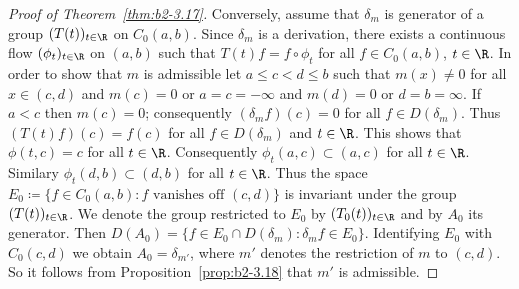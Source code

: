 \begin{proof}[Proof of Theorem~\ref{thm:b2-3.17}]
Conversely, assume that $\delta_{m}$ is generator of a group $(T(t))_{t \in \R}$ on $C_{0}(a,b)$.
Since $\delta_{m}$ is a derivation, there exists a continuous flow $(\phi_{t})_{t \in \R}$ on $(a,b)$ such that $T(t)f = f \circ \phi_{t}$ for all $f \in C_{0}(a,b)$, $t \in \R$.
In order to show that $m$ is admissible let $a \leq c < d \leq b$ such that $m(x) \neq 0$ for all $x \in (c,d)$ and $m(c) = 0$ or $a = c = -\infty$ and $m(d) = 0$ or $d = b = \infty$.
If\/ $a < c$ then $m(c) = 0$; consequently $(\delta_{m}f)(c) = 0$ for all $f \in D(\delta_{m})$.
Thus $(T(t)f)(c) = f(c)$ for all $f \in D(\delta_{m})$ and $t \in \R$.
This shows that $\phi(t,c) = c$ for all $t \in \R$.
Consequently $\phi_{t}(a,c) \subset (a,c)$ for all $t \in \R$.
Similary $\phi_{t}(d,b) \subset (d,b)$ for all $t \in \R$.
Thus the space $E_{0} \coloneqq \{f \in C_{0}(a,b) \colon f \text{ vanishes off } (c,d)\}$ is invariant under the group $(T(t))_{t \in \R}$.
We denote the group restricted to $E_{0}$ by $(T_{0}(t))_{t \in \R}$ and by $A_{0}$ its generator.
Then $D(A_{0}) = \{f \in E_{0} \cap D(\delta_{m}) \colon \delta_{m}f \in E_{0}\}$.
Identifying $E_{0}$ with $C_{0}(c,d)$ we obtain $A_{0} = \delta_{m'}$, where $m'$ denotes the restriction of\/ $m$ to $(c,d)$.
So it follows from Proposition~\ref{prop:b2-3.18} that $m'$ is admissible.
\end{proof}

